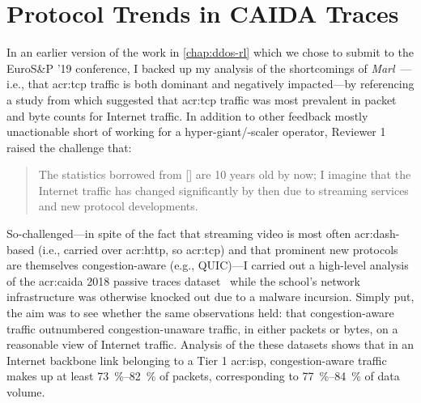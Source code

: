 \chapter{Protocol Trends in CAIDA Traces}\label{adx:caida-traffic}
In an earlier version of the work in \cref{chap:ddos-rl} which we chose to submit to the EuroS\&P '19 conference, I backed up my analysis of the shortcomings of \emph{Marl}~\parencite{DBLP:journals/eaai/MalialisK15}---i.e., that \gls{acr:tcp} traffic is both dominant and negatively impacted---by referencing a study from \Textcite{DBLP:conf/saint/ZhangDJC09} which suggested that \gls{acr:tcp} traffic was most prevalent in packet and byte counts for Internet traffic.
In addition to other feedback mostly unactionable short of working for a hyper-giant/-scaler operator, Reviewer 1 raised the challenge that:
\begin{quote}
\noindent
The statistics borrowed from [\cite{DBLP:conf/saint/ZhangDJC09}] are 10 years old by now; I imagine that the Internet traffic has changed significantly by then due to streaming services and new protocol developments.
\end{quote}
So-challenged---in spite of the fact that streaming video is most often \gls{acr:dash}-based (i.e., carried over \gls{acr:http}, so \gls{acr:tcp}) and that prominent new protocols are themselves congestion-aware (e.g., QUIC)---I carried out a high-level analysis of the \gls{acr:caida} 2018 passive traces dataset~\parencite{caida-2018-passive} while the school's network infrastructure was otherwise knocked out due to a malware incursion.
Simply put, the aim was to see whether the same observations held: that congestion-aware traffic outnumbered congestion-unaware traffic, in either packets or bytes, on a reasonable view of Internet traffic.
Analysis of the these datasets shows that in an Internet backbone link belonging to a Tier 1 \gls{acr:isp}, congestion-aware traffic makes up at least \qtyrange{73}{82}{\percent} of packets, corresponding to \qtyrange{77}{84}{\percent} of data volume.



